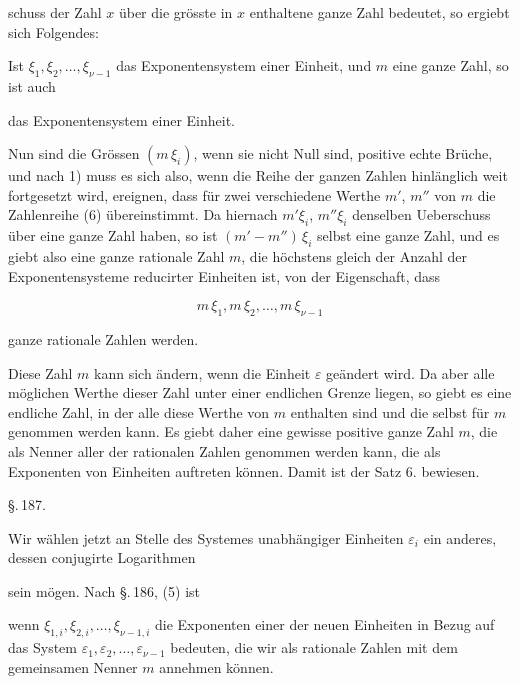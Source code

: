 schuss der Zahl $x$ über die grösste in $x$ enthaltene ganze Zahl
bedeutet, so ergiebt sich Folgendes:

Ist $\xi_1, \xi_2, \ldots, \xi_{\nu-1}$ das Exponentensystem einer Einheit, und
$m$ eine ganze Zahl, so ist auch


das Exponentensystem einer Einheit.

Nun sind die Grössen $(m\,\xi_i)$, wenn sie nicht Null sind,
positive echte Brüche, und nach 1) muss es sich also, wenn die
Reihe der ganzen Zahlen hinlänglich weit fortgesetzt wird, ereignen,
dass für zwei verschiedene Werthe $m'$, $m''$ von $m$ die
Zahlenreihe (6) übereinstimmt. Da hiernach $m'\xi_i$, $m''\xi_i$ denselben
Ueberschuss über eine ganze Zahl haben, so ist $(m' - m'')\,\xi_i$
selbst eine ganze Zahl, und es giebt also eine ganze rationale
Zahl $m$, die höchstens gleich der Anzahl der Exponentensysteme
reducirter Einheiten ist, von der Eigenschaft, dass

\[
m\,\xi_1, m\,\xi_2, \ldots, m\,\xi_{\nu-1}
\]

ganze rationale Zahlen werden.

Diese Zahl $m$ kann sich ändern, wenn die Einheit $\varepsilon$ geändert
wird. Da aber alle möglichen Werthe dieser Zahl unter einer
endlichen Grenze liegen, so giebt es eine endliche Zahl, in der
alle diese Werthe von $m$ enthalten sind und die selbst für $m$
genommen werden kann. Es giebt daher eine gewisse positive
ganze Zahl $m$, die als Nenner aller der rationalen Zahlen genommen
 werden kann, die als Exponenten von Einheiten auftreten
 können. Damit ist der Satz 6. bewiesen.

\begin{center}
\S.\,187.\\[4pt]
\end{center}

Wir wählen jetzt an Stelle des Systemes unabhängiger Einheiten
 $\varepsilon_i$ ein anderes, dessen conjugirte Logarithmen


sein mögen. Nach \S.\,186, (5) ist


wenn $\xi_{1,i}, \xi_{2,i}, \ldots, \xi_{\nu-1,i}$ die Exponenten einer der neuen Einheiten
 in Bezug auf das System $\varepsilon_1, \varepsilon_2, \ldots, \varepsilon_{\nu-1}$ bedeuten, die
wir als rationale Zahlen mit dem gemeinsamen Nenner $m$ annehmen
 können.
